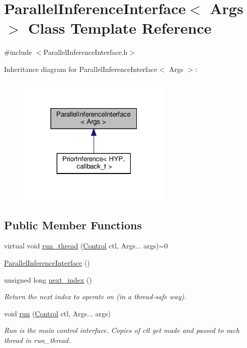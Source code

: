 \hypertarget{class_parallel_inference_interface}{}\section{Parallel\+Inference\+Interface$<$ Args $>$ Class Template Reference}
\label{class_parallel_inference_interface}


{\ttfamily \#include $<$Parallel\+Inference\+Interface.\+h$>$}



Inheritance diagram for Parallel\+Inference\+Interface$<$ Args $>$\+:
\nopagebreak
\begin{figure}[H]
\begin{center}
\leavevmode
\includegraphics[width=208pt]{class_parallel_inference_interface__inherit__graph}
\end{center}
\end{figure}
\subsection*{Public Member Functions}
\begin{DoxyCompactItemize}
\item 
virtual void \hyperlink{class_parallel_inference_interface_a79f626a400fbc11ed530c97f32dfd5c3}{run\+\_\+thread} (\hyperlink{struct_control}{Control} ctl, Args... args)=0
\item 
\hyperlink{class_parallel_inference_interface_a59989833c3d7fde08746087b29c7dcef}{Parallel\+Inference\+Interface} ()
\item 
unsigned long \hyperlink{class_parallel_inference_interface_aaa1fe948131956b21a89c8c267e46b6c}{next\+\_\+index} ()
\begin{DoxyCompactList}\small\item\em Return the next index to operate on (in a thread-\/safe way). \end{DoxyCompactList}\item 
void \hyperlink{class_parallel_inference_interface_a836204d148b8b5187d39e494d926d7b3}{run} (\hyperlink{struct_control}{Control} ctl, Args... args)
\begin{DoxyCompactList}\small\item\em Run is the main control interface. Copies of ctl get made and passed to each thread in run\+\_\+thread. \end{DoxyCompactList}\end{DoxyCompactItemize}
